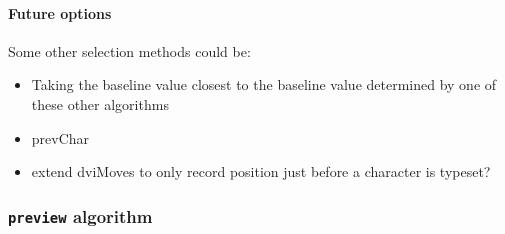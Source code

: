 \documentclass[]{article}
\let\oldparagraph\paragraph
\renewcommand{\paragraph}[1]{\oldparagraph{#1}\mbox{}}
\begin{document}
\begin{adjustwidth}{0.5in}{0in}
\vspace{0.3cm}
 \vspace{0.3cm}
\vspace{0.3cm}
 \vspace{0.3cm}
\vspace{0.3cm}
 \vspace{0.3cm}
\vspace{0.3cm}
 \vspace{0.3cm}
\vspace{0.3cm}
 \vspace{0.3cm}
 \end{adjustwidth}

\paragraph{Future options}\label{future-options}

Some other selection methods could be:

\begin{itemize}
\item
  Taking the baseline value closest to the baseline value determined by
  one of these other algorithms
\item
  prevChar
\item
  extend dviMoves to only record position just before a character is
  typeset?
\end{itemize}

\subsubsection{\texorpdfstring{\texttt{preview}
algorithm}{preview algorithm}}\label{preview-algorithm}
\end{document}
